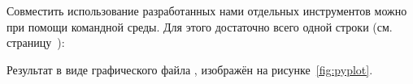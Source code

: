 \begin{center}
\end{center}

\inputminted[linenos, fontsize=\small]{py}{projects/02/plot.py}

Совместить использование разработанных нами отдельных инструментов можно при помощи командной среды. Для этого достаточно всего одной строки (см. страницу~\pageref{sect:shell}):

\noindent Результат в виде графического файла , изображён на рисунке~\ref{fig:pyplot}.
